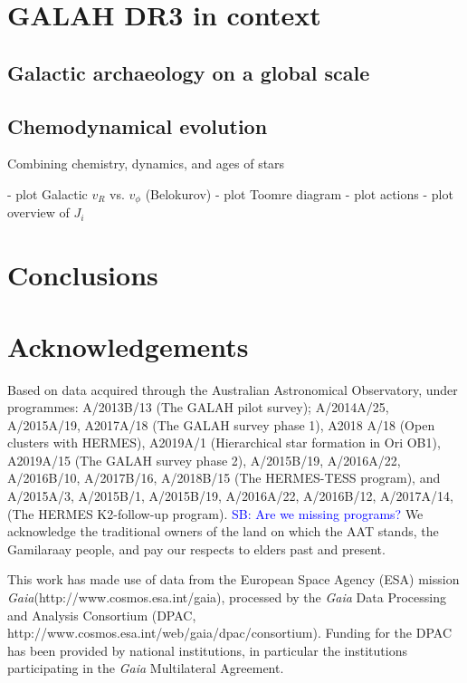 \documentclass[fleqn,usenatbib,useAMS]{mnras}
\newcommand{\Gaia}{\textit{Gaia}\xspace}
\newcommand\SB[1]{\textcolor{blue}{SB: #1}}
\begin{document}
\section{GALAH DR3 in context} \label{sec:galah_in_context}

\subsection{Galactic archaeology on a global scale}  \label{sec:global_ga}

\subsection{Chemodynamical evolution}  \label{sec:cde}

Combining chemistry, dynamics, and ages of stars

- plot Galactic $v_R$ vs. $v_\phi$ (Belokurov)
- plot Toomre diagram
- plot actions
- plot \cite{Vasiliev2019} overview of $J_i$

\section{Conclusions} \label{sec:conclusions}


\section*{Acknowledgements}

Based on data acquired through the Australian Astronomical Observatory, under programmes: A/2013B/13 (The GALAH pilot survey); A/2014A/25, A/2015A/19, A2017A/18 (The GALAH survey phase 1), A2018 A/18 (Open clusters with HERMES), A2019A/1 (Hierarchical star formation in Ori OB1),  A2019A/15 (The GALAH survey phase 2), A/2015B/19, A/2016A/22, A/2016B/10, A/2017B/16, A/2018B/15 (The HERMES-TESS program), and A/2015A/3, A/2015B/1, A/2015B/19, A/2016A/22, A/2016B/12, A/2017A/14, (The HERMES K2-follow-up program). \SB{Are we missing programs?} We acknowledge the traditional owners of the land on which the AAT stands, the Gamilaraay people, and pay our respects to elders past and present.

This work has made use of data from the European Space Agency (ESA) mission \Gaia (http://www.cosmos.esa.int/gaia), processed by the \Gaia Data Processing and Analysis Consortium (DPAC, http://www.cosmos.esa.int/web/gaia/dpac/consortium). Funding for the DPAC has been provided by national institutions, in particular the institutions participating in the \Gaia Multilateral Agreement. 
\end{document}
